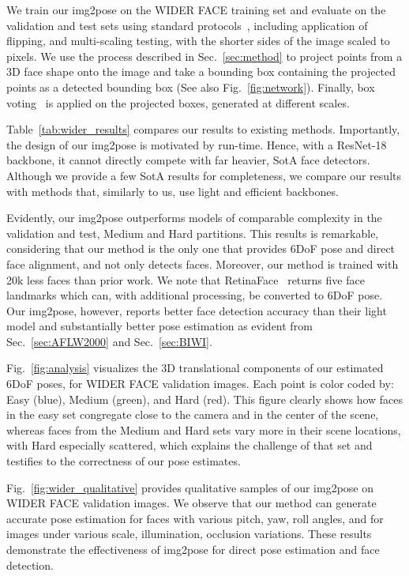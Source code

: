 \documentclass[final]{cvpr}
\newcommand{\minisection}[1]{\vspace{1mm}\noindent{\textbf{#1}.}}
\begin{document}
We train our img2pose on the WIDER FACE training set and evaluate on the validation and test sets using standard protocols~\cite{retinaface, ssh_face, s3_face}, including application of flipping, and multi-scaling testing, with the shorter sides of the image scaled to   pixels. We use the process described in Sec.~\ref{sec:method} to project points from a 3D face shape onto the image and take a bounding box containing the projected points as a detected bounding box (See also Fig.~\ref{fig:network}). Finally, box voting~\cite{gidaris2015object} is applied on the projected boxes, generated at different scales.




\minisection{WIDER FACE detection results} Table~\ref{tab:wider_results} compares our results to existing methods. Importantly, the design of our img2pose is motivated by run-time. Hence, with a ResNet-18 backbone, it cannot directly compete with far heavier, SotA face detectors. Although we provide a few SotA results for completeness, we compare our results with methods that, similarly to us, use light and efficient backbones. 

Evidently, our img2pose outperforms models of comparable complexity in the validation and test,  Medium and Hard partitions. This results is remarkable, considering that our method is the only one that provides 6DoF pose and direct face alignment, and not only detects faces. Moreover, our method is trained with 20k less faces than prior work. We note that RetinaFace~\cite{retinaface} returns five face landmarks which can, with additional processing, be converted to 6DoF pose. Our img2pose, however, reports better face detection accuracy than their light model and substantially better pose estimation as evident from Sec.~\ref{sec:AFLW2000} and Sec.~\ref{sec:BIWI}.

Fig.~\ref{fig:analysis} visualizes the 3D translational components of our estimated 6DoF poses, for WIDER FACE validation images. Each  point is color coded by: Easy (blue), Medium (green), and Hard (red). This figure clearly shows how faces in the easy set congregate close to the camera and in the center of the scene, whereas faces from the Medium and Hard sets vary more in their scene locations, with Hard especially scattered, which explains the challenge of that set and testifies to the correctness of our pose estimates. 


Fig.~\ref{fig:wider_qualitative} provides qualitative samples of our img2pose on WIDER FACE validation images. We observe that our method can generate accurate pose estimation for faces with various pitch, yaw, roll angles, and for images under various scale, illumination, occlusion variations. These results demonstrate the effectiveness of img2pose for direct pose estimation and face detection.
\end{document}
